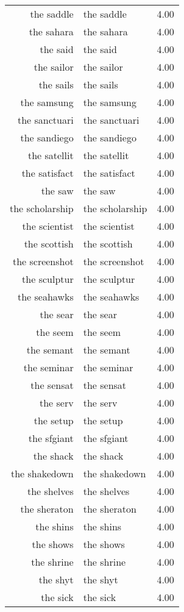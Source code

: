 \begin{table}[ht]
\begin{tabular}{rlr}
  the saddle & the saddle & 4.00 \\ 
  the sahara & the sahara & 4.00 \\ 
  the said & the said & 4.00 \\ 
  the sailor & the sailor & 4.00 \\ 
  the sails & the sails & 4.00 \\ 
  the samsung & the samsung & 4.00 \\ 
  the sanctuari & the sanctuari & 4.00 \\ 
  the sandiego & the sandiego & 4.00 \\ 
  the satellit & the satellit & 4.00 \\ 
  the satisfact & the satisfact & 4.00 \\ 
  the saw & the saw & 4.00 \\ 
  the scholarship & the scholarship & 4.00 \\ 
  the scientist & the scientist & 4.00 \\ 
  the scottish & the scottish & 4.00 \\ 
  the screenshot & the screenshot & 4.00 \\ 
  the sculptur & the sculptur & 4.00 \\ 
  the seahawks & the seahawks & 4.00 \\ 
  the sear & the sear & 4.00 \\ 
  the seem & the seem & 4.00 \\ 
  the semant & the semant & 4.00 \\ 
  the seminar & the seminar & 4.00 \\ 
  the sensat & the sensat & 4.00 \\ 
  the serv & the serv & 4.00 \\ 
  the setup & the setup & 4.00 \\ 
  the sfgiant & the sfgiant & 4.00 \\ 
  the shack & the shack & 4.00 \\ 
  the shakedown & the shakedown & 4.00 \\ 
  the shelves & the shelves & 4.00 \\ 
  the sheraton & the sheraton & 4.00 \\ 
  the shins & the shins & 4.00 \\ 
  the shows & the shows & 4.00 \\ 
  the shrine & the shrine & 4.00 \\ 
  the shyt & the shyt & 4.00 \\ 
  the sick & the sick & 4.00 \\ 

\end{tabular}
\end{table}
